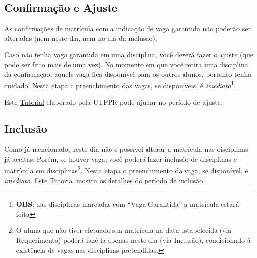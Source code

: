 \documentclass[a4paper,12pt,openany]{article}
\begin{document}
\subsection{Confirmação e Ajuste}
As confirmações de matrícula com a indicação de vaga garantida não poderão ser alteradas (nem neste dia, nem no dia da inclusão).

Caso não tenha vaga garantida em uma disciplina, você deverá fazer o ajuste (que pode ser feito mais de uma vez). No momento em que você retira uma disciplina da confirmação, aquela vaga fica disponível para os outros alunos, portanto tenha cuidado! Nesta etapa o preenchimento das vagas, se disponíveis, é \textit{imediato}\footnote{ \textbf{OBS}: nas disciplinas  marcadas com ``Vaga Garantida''  a matrícula estará feita}.

Este \href{https://wiki.utfpr.edu.br/sistemas/academico/matricula/ajuste.htm}{Tutorial} elaborado pela UTFPR pode ajudar no período de ajuste.

\subsection{Inclusão}

Como já mencionado, neste dia não é possível alterar a matrícula nas disciplinas já aceitas. Porém, se houver vaga, você poderá fazer inclusão de disciplinas e matrícula em disciplinas\footnote{O aluno que não tiver efetuado sua matrícula na data estabelecida (via Requerimento) poderá fazê-la apenas neste dia (via Inclusão), condicionado à existência de vagas nas disciplinas pretendidas.}.
Nesta etapa o preenchimento da vaga, se disponível, é \textit{imediato}. Este \href{https://wiki.utfpr.edu.br/sistemas/academico/matricula/inclusao.htm}{Tutorial} mostra os detalhes do período de inclusão.
\end{document}
